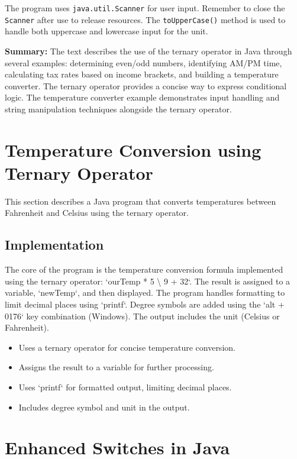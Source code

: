 \documentclass{article}
\begin{document}
The program uses \texttt{java.util.Scanner} for user input.  Remember to close the \texttt{Scanner} after use to release resources.  The \texttt{toUpperCase()} method is used to handle both uppercase and lowercase input for the unit.


\textbf{Summary:} The text describes the use of the ternary operator in Java through several examples: determining even/odd numbers, identifying AM/PM time, calculating tax rates based on income brackets, and building a temperature converter.  The ternary operator provides a concise way to express conditional logic. The temperature converter example demonstrates input handling and string manipulation techniques alongside the ternary operator.


\section{Temperature Conversion using Ternary Operator}

This section describes a Java program that converts temperatures between Fahrenheit and Celsius using the ternary operator.

\subsection{Implementation}

The core of the program is the temperature conversion formula implemented using the ternary operator:  `ourTemp * 5 \textbackslash{} 9 + 32`.  The result is assigned to a variable, `newTemp`, and then displayed. The program handles formatting to limit decimal places using `printf`.  Degree symbols are added using the `alt + 0176` key combination (Windows).  The output includes the unit (Celsius or Fahrenheit).

\begin{itemize}
    \item Uses a ternary operator for concise temperature conversion.
    \item Assigns the result to a variable for further processing.
    \item Uses `printf` for formatted output, limiting decimal places.
    \item Includes degree symbol and unit in the output.
\end{itemize}


\section{Enhanced Switches in Java}
\end{document}
